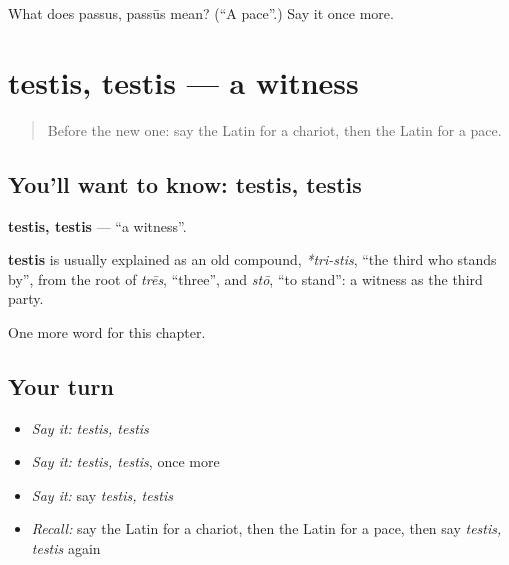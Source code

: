 \begin{tcolorbox}[breakable,colback=teal!4,colframe=teal!35!black,title={Before you move on}]
What does passus, passūs mean? (\textquotedblleft{}A pace\textquotedblright{}.) Say it once more.
\end{tcolorbox}
\section[testis, testis]{testis, testis — a witness}

\label{lesson:LA-C218-testis}



\begin{quote}
Before the new one: say the Latin for a chariot, then the Latin for a pace.
\end{quote}

\subsection*{You'll want to know: testis, testis}
\textbf{testis, testis} — \textquotedblleft{}a witness\textquotedblright{}.

\begin{cousinweb}
\textbf{testis} is usually explained as an old compound, \emph{*tri-stis}, \textquotedblleft{}the third who stands by\textquotedblright{}, from the root of \emph{trēs}, \textquotedblleft{}three\textquotedblright{}, and \emph{stō}, \textquotedblleft{}to stand\textquotedblright{}: a witness as the third party.
\end{cousinweb}

\begin{grammarlens}[title={What you've built}]
One more word for this chapter.
\end{grammarlens}

\subsection*{Your turn}
\begin{itemize}
\raggedright
  \item \emph{Say it:} \emph{testis, testis}
  \item \emph{Say it:} \emph{testis, testis}, once more
  \item \emph{Say it:} say \emph{testis, testis}
  \item \emph{Recall:} say the Latin for a chariot, then the Latin for a pace, then say \emph{testis, testis} again
\end{itemize}

